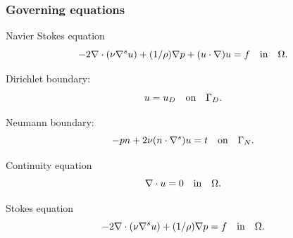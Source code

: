 \documentclass{beamer}
\begin{document}

\begin{frame}
\frametitle{Governing equations}

\begin{block}{Navier Stokes equation}
\begin{equation} \label{navier_stokes}
-2\nabla \cdot (\nu \nabla^s u) + (1/\rho) \nabla p + (u \cdot \nabla)u = f \quad   \textnormal{in}  \quad \Omega \textrm{.}
\end{equation} 

Dirichlet boundary:
\begin{equation}\label{dirichlet_ns}
u=u_D \quad \textnormal{on} \quad \Gamma_D \textrm{.}
\end{equation}

Neumann boundary:
\begin{equation} \label{neumann_ns}
-pn + 2\nu(n \cdot \nabla^s)u = t \quad   \textnormal{on}  \quad \Gamma_N \textrm{.}
\end{equation}
\end{block}

\begin{block}{Continuity equation}
\begin{equation}
\nabla \cdot u=0 \quad   \textnormal{in}  \quad \Omega \textrm{.}
\end{equation}
\end{block}

\begin{block}{Stokes equation}
\begin{equation}
-2\nabla \cdot (\nu \nabla^s u) + (1/\rho) \nabla p = f \quad   \textnormal{in}  \quad \Omega \textrm{.}
\end{equation}
\end{block}
\end{frame}

\end{document}
